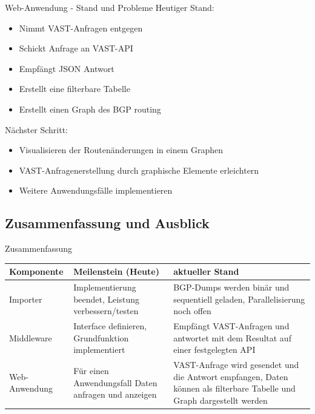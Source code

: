 \documentclass[9pt]{beamer}
\begin{document}
\begin{frame}{Web-Anwendung - Stand und Probleme}
	Heutiger Stand:
	\begin{itemize}
		\item Nimmt VAST-Anfragen entgegen 
		\item Schickt Anfrage an VAST-API
		\item Empfängt JSON Antwort 
		\item Erstellt eine filterbare Tabelle
		\item Erstellt einen Graph des BGP routing
	\end{itemize}
	Nächster Schritt:
	\begin{itemize}
		\item Visualisieren der Routenänderungen in einem Graphen
		\item VAST-Anfragenerstellung durch graphische Elemente erleichtern
		\item Weitere Anwendungsfälle implementieren
	\end{itemize}
\end{frame}

\subsection{Zusammenfassung und Ausblick}

\begin{frame}{Zusammenfassung}

	\begin{table}[h!]
	\centering
	\begin{tabular}{p{5em} p{12em} p{12em}}
		\textbf{Komponente} & \textbf{Meilenstein (Heute)} & \textbf{aktueller Stand} \\ \midrule
		Importer & Implementierung beendet, Leistung verbessern/testen & BGP-Dumps werden binär und sequentiell geladen, Parallelisierung noch offen \\ \midrule
		Middleware & Interface definieren, Grundfunktion implementiert & Empfängt VAST-Anfragen und antwortet mit dem Resultat auf einer festgelegten API \\ \midrule
		Web-Anwendung & Für einen Anwendungsfall Daten anfragen und anzeigen & VAST-Anfrage wird gesendet und die Antwort empfangen, Daten können als filterbare Tabelle und Graph dargestellt werden \\ \bottomrule
	\end{tabular}
	\end{table}
\end{frame}
\end{document}
